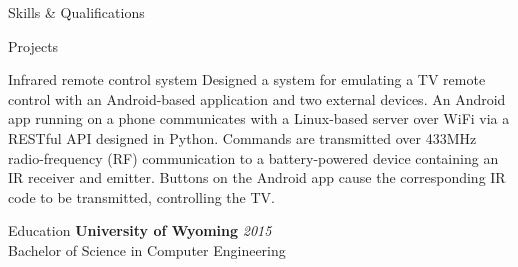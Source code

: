 \documentclass{resume} %
\begin{document}
\begin{rSection}{Skills \& Qualifications}
	\begin{rSubsection}{Projects}
		\begin{rProject}{Infrared remote control system}
			Designed a system for emulating a TV remote control with an Android-based application and two external devices. An Android app running on a phone communicates with a Linux-based server over WiFi via a RESTful API designed in Python. Commands are transmitted over 433MHz radio-frequency (RF) communication to a battery-powered device containing an IR receiver and emitter. Buttons on the Android app cause the corresponding IR code to be transmitted, controlling the TV. 
		\end{rProject}
	\end{rSubsection}
\end{rSection}


	
	
	\begin{rSection}{Education}
		{\bf University of Wyoming} \hfill {\em 2015} 
		\\ Bachelor of Science in Computer Engineering
	\end{rSection}

\end{document}
